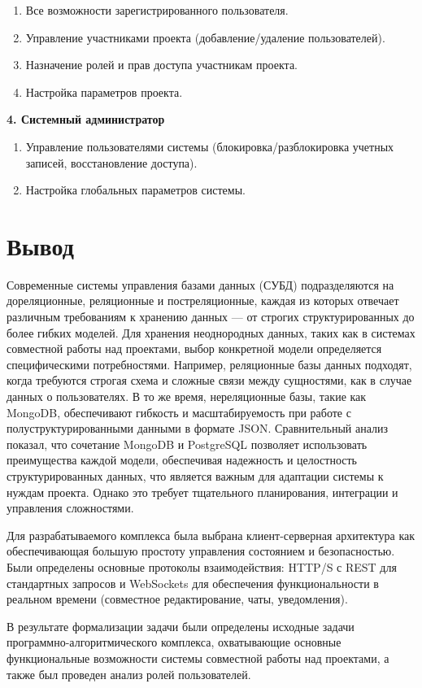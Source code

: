 \begin{enumerate}[wide=12.5mm, leftmargin=12.5mm]
    \item Все возможности зарегистрированного пользователя.
    \item Управление участниками проекта (добавление/удаление пользователей).
    \item Назначение ролей и прав доступа участникам проекта.
    \item Настройка параметров проекта.
\end{enumerate}

\textbf{4. Системный администратор}

\begin{enumerate}[wide=12.5mm, leftmargin=12.5mm]
    \item Управление пользователями системы (блокировка/разблокировка учетных записей, восстановление доступа).
    \item Настройка глобальных параметров системы.
\end{enumerate}

\section*{Вывод}

Современные системы управления базами данных (СУБД) подразделяются на дореляционные, реляционные и постреляционные, каждая из которых отвечает различным требованиям к хранению данных — от строгих структурированных до более гибких моделей. 
Для хранения неоднородных данных, таких как в системах совместной работы над проектами, выбор конкретной модели определяется специфическими потребностями. 
Например, реляционные базы данных подходят, когда требуются строгая схема и сложные связи между сущностями, как в случае данных о пользователях. 
В то же время, нереляционные базы, такие как MongoDB, обеспечивают гибкость и масштабируемость при работе с полуструктурированными данными в формате JSON. 
Сравнительный анализ показал, что сочетание MongoDB и PostgreSQL позволяет использовать преимущества каждой модели, обеспечивая надежность и целостность структурированных данных, что является важным для адаптации системы к нуждам проекта. 
Однако это требует тщательного планирования, интеграции и управления сложностями.

Для разрабатываемого комплекса была выбрана клиент-серверная архитектура как обеспечивающая большую простоту управления состоянием и безопасностью. 
Были определены основные протоколы взаимодействия: HTTP/S с REST для стандартных запросов и WebSockets для обеспечения функциональности в реальном времени (совместное редактирование, чаты, уведомления).

В результате формализации задачи были определены исходные задачи программно-алгоритмического комплекса, охватывающие основные функциональные возможности системы совместной работы над проектами, а также был проведен анализ ролей пользователей.
